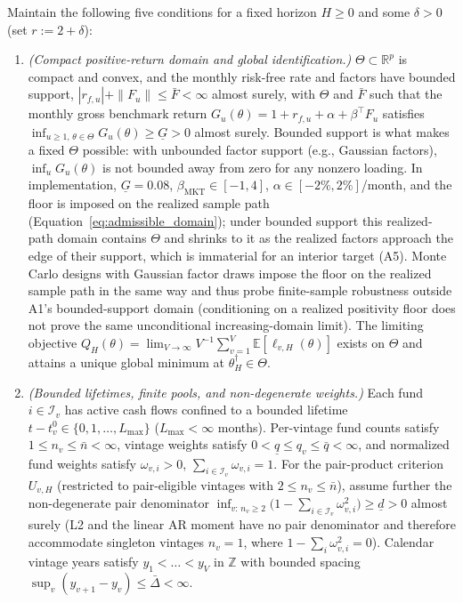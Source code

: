 \begin{assume}
\label{ass:asymptotics_H}
Maintain the following five conditions for a fixed horizon $H \ge 0$ and some $\delta > 0$ (set $r := 2 + \delta$):
\begin{enumerate}
  \item[\textbf{A1}] \emph{(Compact positive-return domain and global identification.)} $\Theta \subset \mathbb{R}^p$ is compact and convex, and the monthly risk-free rate and factors have bounded support, $|r_{f,u}| + \|F_u\| \le \bar{F} < \infty$ almost surely, with $\Theta$ and $\bar{F}$ such that the monthly gross benchmark return $G_u(\theta) = 1 + r_{f,u} + \alpha + \beta^\top F_u$ satisfies $\inf_{u \ge 1,\,\theta \in \Theta} G_u(\theta) \ge \underline{G} > 0$ almost surely. Bounded support is what makes a fixed $\Theta$ possible: with unbounded factor support (e.g., Gaussian factors), $\inf_u G_u(\theta)$ is not bounded away from zero for any nonzero loading. In implementation, $\underline{G} = 0.08$, $\beta_{\mathrm{MKT}} \in [-1,4]$, $\alpha \in [-2\%,2\%]$/month, and the floor is imposed on the realized sample path (Equation~\eqref{eq:admissible_domain}); under bounded support this realized-path domain contains $\Theta$ and shrinks to it as the realized factors approach the edge of their support, which is immaterial for an interior target (A5). Monte Carlo designs with Gaussian factor draws impose the floor on the realized sample path in the same way and thus probe finite-sample robustness outside A1's bounded-support domain (conditioning on a realized positivity floor does not prove the same unconditional increasing-domain limit). The limiting objective $Q_H(\theta) = \lim_{V\to\infty} V^{-1}\sum_{v=1}^V \mathbb{E}[\ell_{v,H}(\theta)]$ exists on $\Theta$ and attains a unique global minimum at $\theta_H^\dagger \in \Theta$.

  \item[\textbf{A2}] \emph{(Bounded lifetimes, finite pools, and non-degenerate weights.)} Each fund $i \in \mathcal{I}_v$ has active cash flows confined to a bounded lifetime $t - t_v^0 \in \{0, 1, \dots, L_{\max}\}$ ($L_{\max} < \infty$ months). Per-vintage fund counts satisfy $1 \le n_v \le \bar{n} < \infty$, vintage weights satisfy $0 < \underline{q} \le q_v \le \bar{q} < \infty$, and normalized fund weights satisfy $\omega_{v,i} > 0$, $\sum_{i \in \mathcal{I}_v}\omega_{v,i}=1$. For the pair-product criterion $U_{v,H}$ (restricted to pair-eligible vintages with $2 \le n_v \le \bar{n}$), assume further the non-degenerate pair denominator $\inf_{v:\,n_v\ge 2} \bigl(1 - \sum_{i\in\mathcal{I}_v}\omega_{v,i}^2\bigr) \ge \underline{d} > 0$ almost surely (L2 and the linear AR moment have no pair denominator and therefore accommodate singleton vintages $n_v = 1$, where $1 - \sum_i \omega_{v,i}^2 = 0$). Calendar vintage years satisfy $y_1 < \dots < y_V$ in $\mathbb{Z}$ with bounded spacing $\sup_v (y_{v+1} - y_v) \le \bar{\Delta} < \infty$.


\end{enumerate}
\end{assume}
